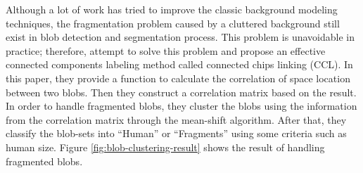 Although a lot of work has tried to improve the classic background
modeling techniques, the fragmentation problem caused by a cluttered
background still exist in blob detection and segmentation
process. This problem is unavoidable in practice;
therefore,  attempt to solve this problem
and propose an effective connected components labeling method called
connected chips linking (CCL). In this paper, they provide a function
to calculate the correlation of space location between two blobs. Then
they construct a correlation matrix based on the result. In order to
handle fragmented blobs, they cluster the blobs using the information
from the correlation matrix through the mean-shift algorithm. After
that, they classify the blob-sets into ``Human'' or ``Fragments''
using some criteria such as human
size. Figure \ref{fig:blob-clustering-result} shows the result of
handling fragmented blobs.

